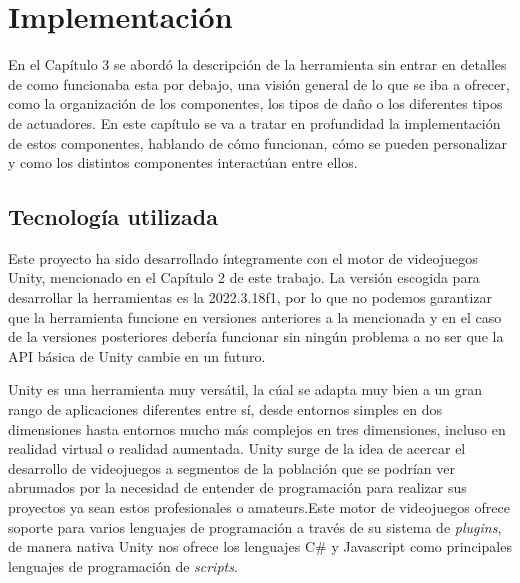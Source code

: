 \setcounter{secnumdepth}{3} %
\chapter{Implementaci\'on}
\label{cap:implementacion}
En el Capítulo 3 se abordó la descripción de la herramienta sin entrar en detalles de como funcionaba esta por debajo, una visión general de lo que se iba a ofrecer, como la organización de los componentes, los tipos de daño o los diferentes tipos de actuadores. En este capítulo se va a tratar en profundidad la implementación de estos componentes, hablando de cómo funcionan, cómo se pueden personalizar y como los distintos componentes interactúan entre ellos.


\section{Tecnología utilizada}
Este proyecto ha sido desarrollado íntegramente con el motor de videojuegos Unity, mencionado en el Capítulo 2 de este trabajo.
La versión escogida para desarrollar la herramientas es la 2022.3.18f1, por lo que no podemos garantizar que la herramienta funcione en versiones anteriores a la mencionada y en el caso de la versiones posteriores debería funcionar sin ningún problema a no ser que la API básica de Unity cambie en un futuro.\\

Unity es una herramienta muy versátil, la cúal se adapta muy bien a un gran rango de aplicaciones diferentes entre sí, desde entornos simples en dos dimensiones hasta entornos mucho más complejos en tres dimensiones, incluso en realidad virtual o realidad aumentada.
Unity surge de la idea de acercar el desarrollo de videojuegos a segmentos de la población que se podrían ver abrumados por la necesidad de entender de programación para realizar sus proyectos ya sean estos profesionales o amateurs.Este motor de videojuegos ofrece soporte para varios lenguajes de programación a través de su sistema de \textit{plugins}, de manera nativa Unity nos ofrece los lenguajes C\# y Javascript como principales lenguajes de programación de \textit{scripts}.\\

